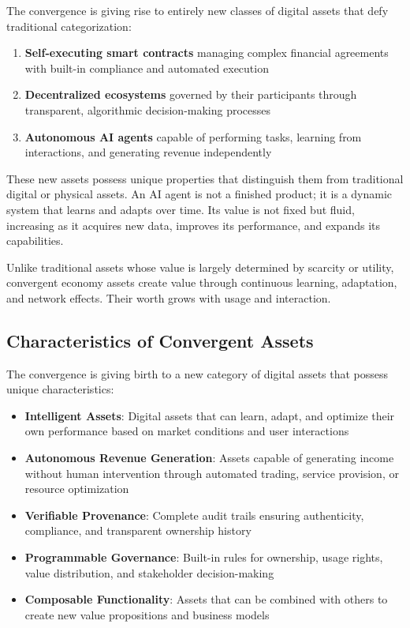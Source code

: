 \documentclass[11pt,a4paper]{report}
\begin{document}
The convergence is giving rise to entirely new classes of digital assets that defy traditional categorization:

\begin{enumerate}
    \item \textbf{Self-executing smart contracts} managing complex financial agreements with built-in compliance and automated execution
    \item \textbf{Decentralized ecosystems} governed by their participants through transparent, algorithmic decision-making processes
    \item \textbf{Autonomous AI agents} capable of performing tasks, learning from interactions, and generating revenue independently
\end{enumerate}

These new assets possess unique properties that distinguish them from traditional digital or physical assets. An AI agent is not a finished product; it is a dynamic system that learns and adapts over time. Its value is not fixed but fluid, increasing as it acquires new data, improves its performance, and expands its capabilities.

\begin{keypoint}
Unlike traditional assets whose value is largely determined by scarcity or utility, convergent economy assets create value through continuous learning, adaptation, and network effects. Their worth grows with usage and interaction.
\end{keypoint}

\subsection{Characteristics of Convergent Assets}

The convergence is giving birth to a new category of digital assets that possess unique characteristics:

\begin{itemize}
    \item \textbf{Intelligent Assets}: Digital assets that can learn, adapt, and optimize their own performance based on market conditions and user interactions
    \item \textbf{Autonomous Revenue Generation}: Assets capable of generating income without human intervention through automated trading, service provision, or resource optimization
    \item \textbf{Verifiable Provenance}: Complete audit trails ensuring authenticity, compliance, and transparent ownership history
    \item \textbf{Programmable Governance}: Built-in rules for ownership, usage rights, value distribution, and stakeholder decision-making
    \item \textbf{Composable Functionality}: Assets that can be combined with others to create new value propositions and business models
\end{itemize}
\end{document}

